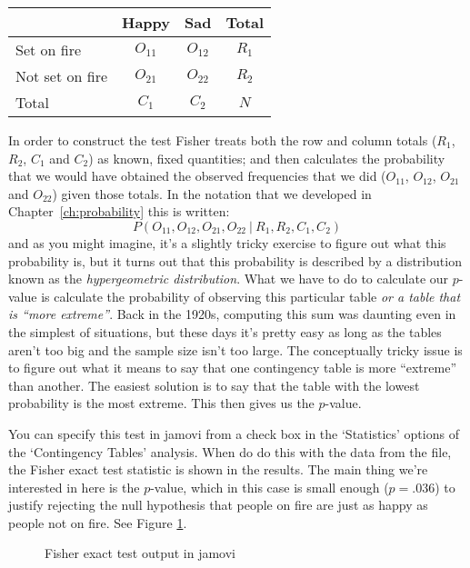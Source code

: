 \begin{center}
\begin{tabular}{l|cc|c}
& Happy & Sad & Total \\ \hline
Set on fire   & $O_{11}$ & $O_{12}$ & $R_{1}$ \\
Not set on fire & $O_{21}$ & $O_{22}$ & $R_{2}$ \\ \hline
Total & $C_{1}$ & $C_{2}$ & $N$
\end{tabular}
\end{center}

\noindent
In order to construct the test Fisher treats both the row and column totals ($R_1$, $R_2$, $C_1$ and $C_2$) as known, fixed quantities; and then calculates the probability that we would have obtained the observed frequencies that we did ($O_{11}$, $O_{12}$, $O_{21}$ and $O_{22}$) given those totals. In the notation that we developed in Chapter~\ref{ch:probability} this is written:
$$
P(O_{11}, O_{12}, O_{21}, O_{22} \ | \ R_1, R_2, C_1, C_2) 
$$
and as you might imagine, it's a slightly tricky exercise to figure out what this probability is, but it turns out that this probability is described by a distribution known as the {\it hypergeometric distribution}. What we have to do to calculate our $p$-value is calculate the probability of observing this particular table {\it or a table that is ``more extreme''}. Back in the 1920s, computing this sum was daunting even in the simplest of situations, but these days it's pretty easy as long as the tables aren't too big and the sample size isn't too large. The conceptually tricky issue is to figure out what it means to say that one contingency table is more ``extreme'' than another. The easiest solution is to say that the table with the lowest probability is the most extreme. This then gives us the $p$-value. 

You can specify this test in jamovi from a check box in the `Statistics' options of the `Contingency Tables' analysis. When do do this with the data from the  file, the Fisher exact test statistic is shown in the results. The main thing we're interested in here is the $p$-value, which in this case is small enough ($p=.036$) to justify rejecting the null hypothesis that people on fire are just as happy as people not on fire. See Figure \ref{fig:Fisher}.

\begin{figure}
\begin{center}
\caption{Fisher exact test output in jamovi}
\label{fig:Fisher}
\HR
\end{center}
\end{figure}

